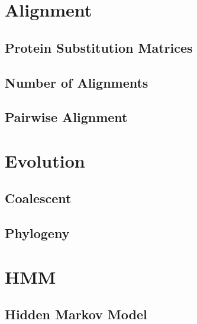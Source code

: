 \documentclass{book}
\begin{document}
\part{Alignment}
\chapter{Protein Substitution Matrices}

\chapter{Number of Alignments}

\chapter{Pairwise Alignment}


\part{Evolution}
\chapter{Coalescent}

\chapter{Phylogeny}


\part{HMM}
\chapter{Hidden Markov Model}


\backmatter

\end{document}
